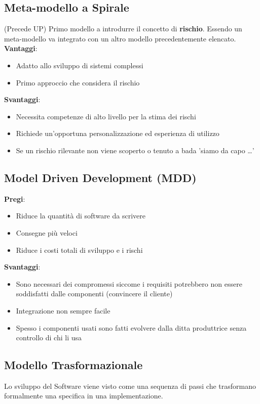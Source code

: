 \subsection{Meta-modello a Spirale}
(Precede UP) Primo modello a introdurre il concetto di \textbf{rischio}. Essendo un meta-modello va integrato con un altro modello precedentemente elencato.\\
\noindent \textbf{Vantaggi}:
\begin{itemize}
    \item Adatto allo sviluppo di sistemi complessi
    \item Primo approccio che considera il rischio
\end{itemize}

\noindent \textbf{Svantaggi}:
\begin{itemize}
    \item Necessita competenze di alto livello per la stima dei rischi
    \item Richiede un’opportuna personalizzazione ed esperienza di utilizzo
    \item Se un rischio rilevante non viene scoperto o tenuto a bada 'siamo da capo …'
\end{itemize}

\break
\subsection{Model Driven Development (MDD)}
\textbf{Pregi}:
\begin{itemize}
    \item Riduce la quantità di software da scrivere
    \item Consegne più veloci
    \item Riduce i costi totali di sviluppo e i rischi
\end{itemize}

\noindent \textbf{Svantaggi}:
\begin{itemize}
    \item Sono necessari dei compromessi siccome i requisiti potrebbero non essere soddisfatti dalle componenti (convincere il cliente)
    \item Integrazione non sempre facile
    \item Spesso i componenti usati sono fatti evolvere dalla ditta produttrice senza controllo di chi li usa
\end{itemize}

\subsection{Modello Trasformazionale}
Lo sviluppo del Software viene visto come una sequenza di passi che trasformano formalmente una specifica in una implementazione.
